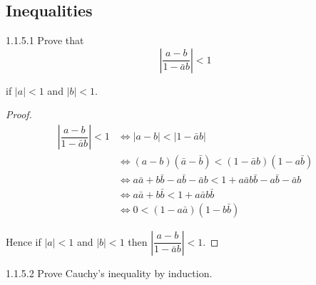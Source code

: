 \subsection{Inequalities}

\begin{problem}{1.1.5.1}
Prove that
\[
	\left\vert \dfrac{a - b}{1 - \bar{a}b} \right\vert < 1
\]

if \( \left\vert a \right\vert < 1 \) and \( \left\vert b \right\vert < 1 \).
\end{problem}

\begin{proof}
	\begingroup
	\allowdisplaybreaks%
	\begin{align*}
		\left\vert \dfrac{a - b}{1 - \bar{a}b} \right\vert < 1 & \iff \left\vert a - b \right\vert < \left\vert 1 - \bar{a}b \right\vert                     \\
		                                                       & \iff (a - b)(\bar{a} - \bar{b}) < (1 - \bar{a}b)(1 - a\bar{b})                              \\
		                                                       & \iff a\bar{a} + b\bar{b} - a\bar{b} - \bar{a}b < 1 + a\bar{a}b\bar{b} - a\bar{b} - \bar{a}b \\
		                                                       & \iff a\bar{a} + b\bar{b} < 1 + a\bar{a}b\bar{b}                                             \\
		                                                       & \iff 0 < (1 - a\bar{a})(1 - b\bar{b})
	\end{align*}
	\endgroup

	Hence if \( \left\vert a \right\vert < 1 \) and \( \left\vert b \right\vert < 1 \) then \( \left\vert \dfrac{a - b}{1 - \bar{a}b} \right\vert < 1 \).
\end{proof}

\begin{problem}{1.1.5.2}
Prove Cauchy's inequality by induction.
\end{problem}

